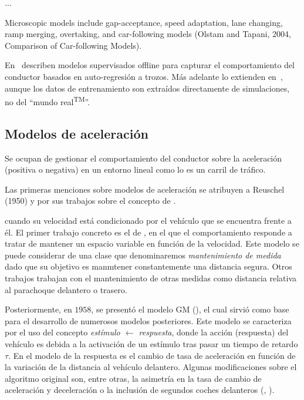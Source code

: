 ...

Microscopic models include gap-acceptance, speed adaptation, lane changing, ramp merging, overtaking, and car-following models (Olstam and Tapani, 2004, Comparison of Car-following Models).

En~\cite{sekizawa2007modeling} describen modelos supervisados offline para capturar el comportamiento del conductor basados en auto-regresión a trozos. Más adelante lo extienden en~\cite{terada2010multi}, aunque los datos de entrenamiento son extraídos directamente de simulaciones, no del \enquote{mundo real\textsuperscript{TM}}.

\subsection{Modelos de aceleración}

Se ocupan de gestionar el comportamiento del conductor sobre la aceleración (positiva o negativa) en un entorno lineal como lo es un carril de tráfico.

Las primeras menciones sobre modelos de aceleración se atribuyen a Reuschel (1950) y \cite{Pipes1953} por sus trabajos sobre el concepto de \textit{}.

 cuando su velocidad está condicionado por el vehículo que se encuentra frente a él. El primer trabajo concreto es el de \cite{Pipes1953}, en el que el comportamiento responde a tratar de mantener un espacio variable en función de la velocidad. Este modelo se puede considerar de una clase que denominaremos \textit{mantenimiento de medida} dado que su objetivo es manmtener constantemente una distancia segura. Otros trabajos trabajan con el mantenimiento de otras medidas como distancia relativa al parachoque delantero o trasero.

Posteriormente, en $1958$, se presentó el modelo GM (\cite{Chandler1958}), el cual sirvió como base para el desarrollo de numerosos modelos posteriores. Este modelo se caracteriza por el uso del concepto \textit{estímulo $\leftarrow$ respuesta}, donde la acción (respuesta) del vehículo es debida a la activación de un estímulo tras pasar un tiempo de retardo  $\tau$. En el modelo de \cite{Chandler1958} la respuesta es el cambio de tasa de aceleración en función de la variación de la distancia al vehículo delantero. Algunas modificaciones sobre el algoritmo original son, entre otras, la asimetría en la tasa de cambio de aceleración y deceleración o la inclusión de segundos coches delanteros (\cite{Gazis1959}, \cite{Bexelius1968}).

